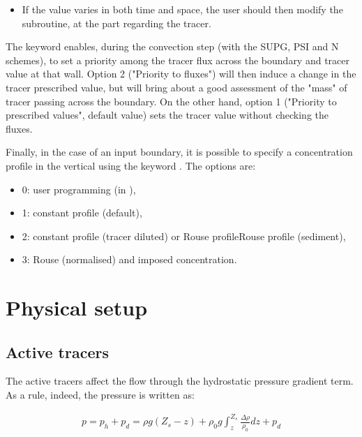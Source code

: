 \begin{itemize}
\item  If the value varies in both time and space, the user should then modify
the  subroutine, at the part regarding the tracer.
\end{itemize}

The keyword  enables, during the
convection step (with the SUPG, PSI and N schemes), to set a priority among the
tracer flux across the boundary and tracer value at that wall. Option 2
("Priority to fluxes") will then induce a change in the tracer prescribed
value, but will bring about a good assessment of the "mass" of tracer passing
across the boundary. On the other hand, option 1 ("Priority to prescribed
values", default value) sets the tracer value without checking the fluxes.

Finally, in the case of an input boundary, it is possible to specify a
concentration profile in the vertical using the keyword . The options are:

\begin{itemize}
\item  0: user programming (in ),

\item  1: constant profile (default),

\item  2: constant profile (tracer diluted) or Rouse profileRouse profile
(sediment),

\item  3: Rouse (normalised) and imposed concentration.
\end{itemize}

\section{Physical setup}

\subsection{Active tracers}

The active tracers affect the flow through the hydrostatic pressure gradient
term. As a rule, indeed, the pressure is written as:

\begin{align}
p=p_{h} +p_{d} =\rho g(Z_{s} -z)+\rho _{0} g\int _{z}^{Z_{s} }\frac{\Delta \rho
}{\rho _{0} }  dz+p_{d}
\end{align}

